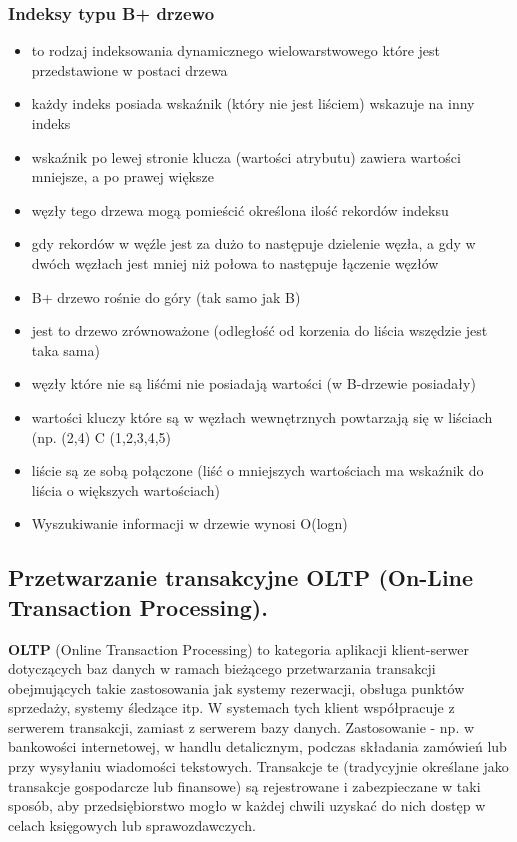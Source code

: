 \documentclass[a4paper,12pt,oneside]{book}
\begin{document}
				\subsubsection{Indeksy typu B+ drzewo}
				\begin{itemize}
				\itemsep 0em
				\item to rodzaj indeksowania dynamicznego wielowarstwowego które jest przedstawione w postaci drzewa
				\item każdy indeks posiada wskaźnik (który nie jest liściem) wskazuje na inny indeks
				\item wskaźnik po lewej stronie klucza (wartości atrybutu) zawiera wartości mniejsze, a po prawej większe
				\item węzły tego drzewa mogą pomieścić określona ilość rekordów indeksu
				\item gdy rekordów w węźle jest za dużo to następuje dzielenie węzła, a gdy w dwóch węzłach jest mniej niż połowa to następuje łączenie węzłów
				\item B+ drzewo rośnie do góry (tak samo jak B)
				\item jest to drzewo zrównoważone (odległość od korzenia do liścia wszędzie jest taka sama)
				\item węzły które nie są liśćmi nie posiadają wartości (w B-drzewie posiadały)
				\item wartości kluczy które są w węzłach wewnętrznych powtarzają się w liściach (np. (2,4) C (1,2,3,4,5)
				\item liście są ze sobą połączone (liść o mniejszych wartościach ma wskaźnik do liścia o większych wartościach)
				\item Wyszukiwanie informacji w drzewie wynosi O(logn)
				\end{itemize}

			\newpage\subsection{Przetwarzanie transakcyjne OLTP (On-Line Transaction Processing).}
		\textbf{OLTP} (Online Transaction Processing) to kategoria aplikacji klient-serwer dotyczących baz danych w ramach bieżącego przetwarzania transakcji obejmujących takie zastosowania jak systemy rezerwacji, obsługa punktów sprzedaży, systemy śledzące itp. W systemach tych klient współpracuje z serwerem transakcji, zamiast z serwerem bazy danych.  Zastosowanie - np. w bankowości internetowej, w handlu detalicznym, podczas składania zamówień lub przy wysyłaniu wiadomości tekstowych. Transakcje te (tradycyjnie określane jako transakcje gospodarcze lub finansowe) są rejestrowane i zabezpieczane w taki sposób, aby przedsiębiorstwo mogło w każdej chwili uzyskać do nich dostęp w celach księgowych lub sprawozdawczych. \\
\end{document}
